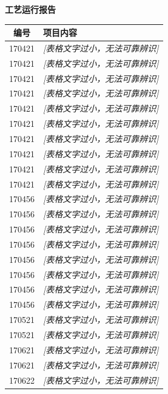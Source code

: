 \documentclass[UTF8,10pt,a4paper,fontset=fandol]{ctexart}
\begin{document}
\begin{center}
\begin{minipage}[t]{0.47\textwidth}
\centering
\textbf{工艺运行报告}

\small
\begin{tabularx}{\textwidth}{|c|X|}
\hline
\textbf{编号} & \textbf{项目内容} \\ \hline
170421 & \textit{[表格文字过小，无法可靠辨识]} \\ \hline
170421 & \textit{[表格文字过小，无法可靠辨识]} \\ \hline
170421 & \textit{[表格文字过小，无法可靠辨识]} \\ \hline
170421 & \textit{[表格文字过小，无法可靠辨识]} \\ \hline
170421 & \textit{[表格文字过小，无法可靠辨识]} \\ \hline
170421 & \textit{[表格文字过小，无法可靠辨识]} \\ \hline
170421 & \textit{[表格文字过小，无法可靠辨识]} \\ \hline
170421 & \textit{[表格文字过小，无法可靠辨识]} \\ \hline
170421 & \textit{[表格文字过小，无法可靠辨识]} \\ \hline
170421 & \textit{[表格文字过小，无法可靠辨识]} \\ \hline
170456 & \textit{[表格文字过小，无法可靠辨识]} \\ \hline
170456 & \textit{[表格文字过小，无法可靠辨识]} \\ \hline
170456 & \textit{[表格文字过小，无法可靠辨识]} \\ \hline
170456 & \textit{[表格文字过小，无法可靠辨识]} \\ \hline
170456 & \textit{[表格文字过小，无法可靠辨识]} \\ \hline
170456 & \textit{[表格文字过小，无法可靠辨识]} \\ \hline
170456 & \textit{[表格文字过小，无法可靠辨识]} \\ \hline
170456 & \textit{[表格文字过小，无法可靠辨识]} \\ \hline
170521 & \textit{[表格文字过小，无法可靠辨识]} \\ \hline
170521 & \textit{[表格文字过小，无法可靠辨识]} \\ \hline
170621 & \textit{[表格文字过小，无法可靠辨识]} \\ \hline
170621 & \textit{[表格文字过小，无法可靠辨识]} \\ \hline
170622 & \textit{[表格文字过小，无法可靠辨识]} \\ \hline
\end{tabularx}


\end{minipage}
\end{center}
\end{document}
